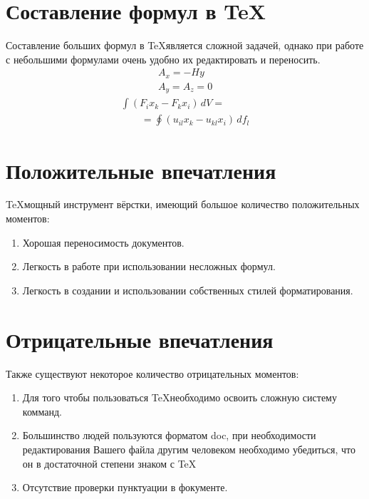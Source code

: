 \documentclass[utf8x, 12pt]{G7-32}
\begin{document}
\chapter{Составление формул в \TeX}

Составление больших формул в \TeX является сложной задачей, однако при работе с небольшими формулами очень удобно их редактировать и переносить.\hfil\break
\begin{gather}
A_x = -Hy \\
A_y = A_z = 0
\end{gather}
\begin{eqnarray*}
& \int(F_i x_k - F_k x_i)\,dV = & \\
& \qquad=\oint(u_{il}x_k-u_{kl}x_i)\,df_l &
\end{eqnarray*}



\chapter{Положительные впечатления}

\TeX мощный инструмент вёрстки, имеющий большое количество положительных моментов:

\begin{enumerate}
	\item  Хорошая переносимость документов.
	\item Легкость в работе при использовании несложных формул.
	\item Легкость в создании и использовании собственных стилей форматирования.
	
\end{enumerate}



\chapter{Отрицательные впечатления}

Также существуют некоторое количество отрицательных моментов: 
\begin{enumerate}
	\item Для того чтобы пользоваться \TeX необходимо освоить сложную систему комманд.
	\item Большинство людей пользуются форматом doc, при необходимости редактирования Вашего файла другим человеком необходимо убедиться, что он в достаточной степени знаком с \TeX 
	\item Отсутствие проверки пунктуации в фокументе.
	

\end{enumerate}
\end{document}

